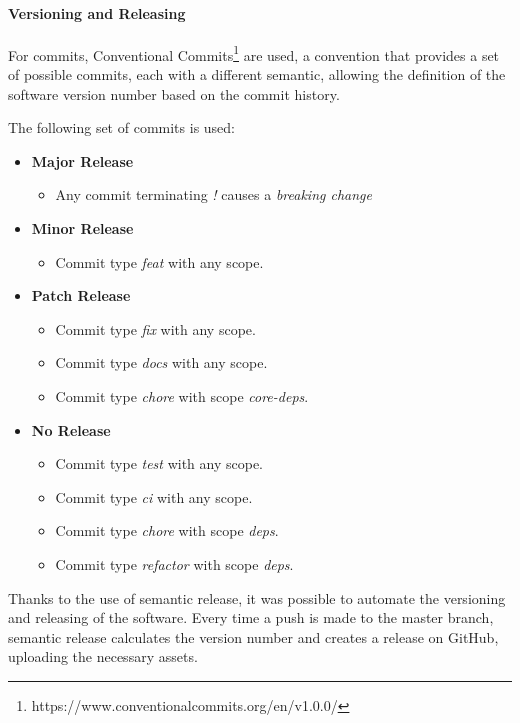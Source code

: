 \documentclass[12pt,a4paper,openright,twoside]{book}
\begin{document}
\paragraph*{Versioning and Releasing}
For commits, Conventional Commits\footnote{https://www.conventionalcommits.org/en/v1.0.0/} are used, a convention that provides a set of possible commits, 
each with a different semantic, allowing the definition of the software version number based on the commit history.

The following set of commits is used:
\begin{itemize}
  \item \textbf{Major Release} 
  \begin{itemize}
    \item Any commit terminating \textit{!} causes a \emph{breaking change}
  \end{itemize}

  \item \textbf{Minor Release} 
  \begin{itemize}
    \item Commit type \emph{feat} with any scope.
  \end{itemize}

  \item \textbf{Patch Release} 
  \begin{itemize}
    \item Commit type \emph{fix} with any scope.
    \item Commit type \emph{docs} with any scope.
    \item Commit type \emph{chore} with scope \textit{core-deps}.
  \end{itemize}

  \item \textbf{No Release} 
  \begin{itemize}
    \item Commit type \emph{test} with any scope.
    \item Commit type \emph{ci} with any scope.
    \item Commit type \emph{chore} with scope \textit{deps}.
    \item Commit type \emph{refactor} with scope \textit{deps}.
  \end{itemize}
\end{itemize}

Thanks to the use of semantic release, it was possible to automate the versioning and releasing of the software. 
Every time a push is made to the master branch, semantic release calculates the version number and creates a release on GitHub, uploading the necessary assets.
\end{document}
